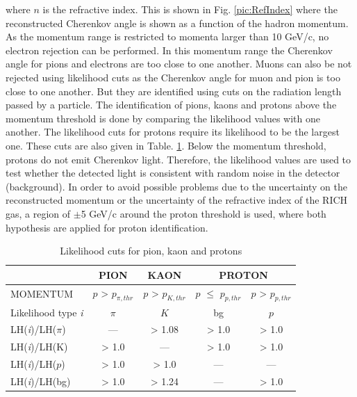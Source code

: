 where $n$ is the refractive index. This is shown in Fig. \ref{pic:RefIndex} where the reconstructed Cherenkov angle is shown as a function of the hadron momentum. As the momentum range is restricted to momenta larger than 10 GeV/c, no electron rejection can be performed. In this momentum range the Cherenkov angle for pions and electrons are too close to one another. Muons can also be not rejected using likelihood cuts as the Cherenkov angle for muon and pion is too close to one another. But they are identified using cuts on the radiation length passed by a particle. The identification of pions, kaons and protons above the momentum threshold is done by comparing the likelihood values with one another. The likelihood cuts for protons require its likelihood to be the largest one. These cuts are also given in Table. \ref{tab:LHcut}. Below the momentum threshold, protons do not emit Cherenkov light. Therefore, the likelihood values are used to test whether the detected light is consistent with random noise in the detector (background). In order to avoid possible problems due to the uncertainty on the reconstructed momentum or the uncertainty of the refractive index of the RICH gas, a region of $\pm$5 GeV/c around the proton threshold is used, where both hypothesis are applied for proton identification.

\begin{table}[!h]
  \caption{Likelihood cuts for pion, kaon and protons}
  \label{tab:LHcut}
  \centering
  \begin{tabular}{lcccc}
    \hline
     & PION & KAON & \multicolumn{2}{c}{PROTON} \\
    \hline
    MOMENTUM & $p$ > $p_{\pi,thr}$ & $p$ > $p_{K,thr}$ & $p$ $\leq$ $p_{p,thr}$ & $p$ > $p_{p,thr}$ \\
    Likelihood type \textit{i} & $\pi$ & $K$ & bg & $p$ \\
    LH(\textit{i})/LH($\pi$) & --- & > 1.08 & > 1.0 & > 1.0 \\
    LH(\textit{i})/LH(K) & > 1.0 & --- & > 1.0 & > 1.0 \\
    LH(\textit{i})/LH($p$) & > 1.0 & > 1.0 & --- & --- \\
    LH(\textit{i})/LH(bg) & > 1.0 & > 1.24 & --- & > 1.0 \\
    \hline
  \end{tabular}
\end{table}

